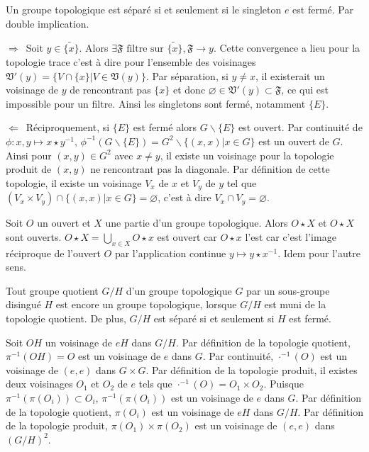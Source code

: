 \documentclass[a4paper, 11pt, french]{book}
\theoremstyle{plain} %
\theoremstyle{definition} %
\theoremstyle{remark} %
\newcommand\impldir{$\boxed{\Rightarrow}$\ }
\newcommand\implrec{$\boxed{\Leftarrow}$\ }
\renewcommand{\setminus}{\backslash}
\newcommand{\1}{\mathds{1}}
\newcommand\vide{\varnothing}
\newcommand{\inv}[1]{#1^{-1}}
\begin{document}
\proposition
Un groupe topologique est séparé si et seulement si le singleton ${e}$ est fermé.
\demonstration Par double implication.

\impldir Soit $y\in\widetilde{\{x\}}$.
Alors $\exists\mathfrak{F}\text{ filtre sur $\widetilde{\{x\}}$}, \mathfrak{F}\rightarrow y$.
Cette convergence a lieu pour la topologie trace c'est à dire pour l'ensemble des voisinages $\mathfrak{V}'(y)=\{V\cap\{x\}|V\in\mathfrak{V}(y)\}$.
Par séparation, si $y\neq x$, il existerait un voisinage de $y$ de rencontrant pas $\{x\}$ et donc $\vide\in\mathfrak{V}'(y)\subset\mathfrak{F}$, ce qui est impossible pour un filtre.
Ainsi les singletons sont fermé, notamment $\{E\}$.

\implrec Réciproquement, si $\{E\}$ est fermé alors $G\setminus\{E\}$ est ouvert.
Par continuité de $\phi:x, y\longmapsto x\star\inv{y}$, $\inv{\phi}(G\setminus\{E\})=G^2\setminus\{(x, x)|x\in G\}$ est un ouvert de $G$.
Ainsi pour $(x, y)\in G^2$ avec $x\neq y$, il existe un voisinage pour la topologie produit de $(x, y)$ ne rencontrant pas la diagonale.
Par définition de cette topologie, il existe un voisinage $V_x$ de $x$ et $V_y$ de $y$ tel que $(V_x\times V_y)\cap\{(x, x)|x\in G\}=\vide$, c'est à dire $V_x\cap V_y=\vide$.

\proposition
Soit $O$ un ouvert et $X$ une partie d'un groupe topologique.
Alors $O\star X$ et $O\star X$ sont ouverts.
\demonstration
$O\star X=\bigcup_{x\in X}O\star x$ est ouvert car $O\star x$ l'est car c'est l'image réciproque de l'ouvert $O$ par l'application continue $y\longmapsto y\star x^{-1}$.
Idem pour l'autre sens.

\proposition
Tout groupe quotient $G/H$ d'un groupe topologique $G$ par un sous-groupe disingué $H$ est encore un groupe topologique, lorsque $G/H$ est muni de la topologie quotient.
De plus, $G/H$ est séparé si et seulement si $H$ est fermé.
\demonstration

Soit $OH$ un voisinage de $eH$ dans $G/H$.
Par définition de la topologie quotient, $\inv{\pi}(OH)=O$ est un voisinage de $e$ dans $G$.
Par continuité, $\inv{\cdot}(O)$ est un voisinage de $(e, e)$ dans $G\times G$.
Par définition de la topologie produit, il existes deux voisinages $O_1$ et $O_2$ de $e$ tels que $\inv{\cdot}(O)=O_1\times O_2$.
Puisque $\inv{\pi}(\pi(O_i))\subset O_i$, $\inv{\pi}(\pi(O_i))$ est un voisinage de $e$ dans $G$.
Par définition de la topologie quotient, $\pi(O_i)$ est un voisinage de $eH$ dans $G/H$.
Par définition de la topologie produit, $\pi(O_1)\times\pi(O_2)$ est un voisinage de $(e, e)$ dans $(G/H)^2$.
\end{document}
